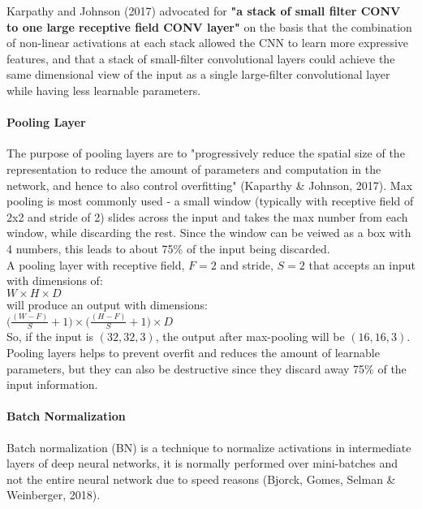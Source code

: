 \documentclass[11pt]{article}
\begin{document}
Karpathy and Johnson (2017) advocated for \textbf{"a stack of small
filter CONV to one large receptive field CONV layer"} on the basis that
the combination of non-linear activations at each stack allowed the CNN
to learn more expressive features, and that a stack of small-filter
convolutional layers could achieve the same dimensional view of the
input as a single large-filter convolutional layer while having less
learnable parameters.

\paragraph{Pooling Layer}\label{pooling-layer}

The purpose of pooling layers are to "progressively reduce the spatial
size of the representation to reduce the amount of parameters and
computation in the network, and hence to also control overfitting"
(Kaparthy \& Johnson, 2017). Max pooling is most commonly used - a small
window (typically with receptive field of 2x2 and stride of 2) slides
across the input and takes the max number from each window, while
discarding the rest. Since the window can be veiwed as a box with 4
numbers, this leads to about 75\% of the input being discarded.\\

A pooling layer with receptive field, \(F = 2\) and stride, \(S=2\) that
accepts an input with dimensions of:\\

\(W \times H \times D\)\\

will produce an output with dimensions:\\

\(\bigg(\frac{(W-F)}{S} + 1\bigg) \times \bigg(\frac{(H-F)}{S} + 1\bigg) \times D\)\\

So, if the input is \((32,32,3)\), the output after max-pooling will be
\((16,16,3)\).\\

Pooling layers helps to prevent overfit and reduces the amount of
learnable parameters, but they can also be destructive since they
discard away 75\% of the input information.

\paragraph{Batch Normalization}\label{batch-normalization}

Batch normalization (BN) is a technique to normalize activations in
intermediate layers of deep neural networks, it is normally performed
over mini-batches and not the entire neural network due to speed reasons
(Bjorck, Gomes, Selman \& Weinberger, 2018).\\
\end{document}
